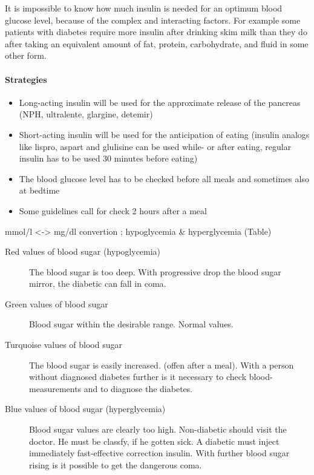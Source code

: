 \documentclass[pdflatex,a4paper,11pt,english]{scrreprt}
\begin{document}
It is impossible to know how much insulin is needed for an optimum blood glucose level, because of the complex and 
interacting factors. For example some patients with diabetes require more insulin after drinking skim milk than 
they do after taking an equivalent amount of fat, protein, carbohydrate, and fluid in some other form.\\

\paragraph{Strategies}

\begin{itemize}
  \item Long-acting insulin will be used for the approximate release of the pancreas (NPH, ultralente, glargine, detemir)
  \item Short-acting insulin will be used for the anticipation of eating (insulin analogs like lispro, aspart and 
	  glulisine can be used while- or after eating, regular insulin has to be used 30 minutes before eating)
  \item The blood glucose level has to be checked before all meals and sometimes also at bedtime
  \item Some guidelines call for check 2 hours after a meal
\end{itemize}

mmol/l <-> mg/dl convertion ; hypoglycemia \& hyperglycemia (Table)\\

\begin{description}
  \item[Red values of blood sugar (hypoglycemia)] The blood sugar is too deep. With progressive drop the blood sugar mirror, the diabetic can fall in coma.
  \item[Green values of blood sugar] Blood sugar within the desirable range. Normal values.
  \item[Turquoise values of blood sugar] The blood sugar is easily increased. (offen after a meal). With a person without diagnosed diabetes further is it necessary to check blood-measurements and to diagnose the diabetes.
  \item[Blue values of blood sugar (hyperglycemia)] Blood sugar values are clearly too high. Non-diabetic should visit the doctor. 
He must be classfy, if he gotten sick. A diabetic must inject immediately fast-effective correction insulin. 
With further blood sugar rising is it possible to get the dangerous coma.
\end{description}
\end{document}
